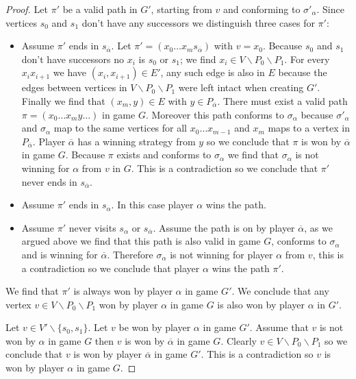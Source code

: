 \begin{lemma}
\begin{proof}
		Let $\pi'$ be a valid path in $G'$, starting from $v$ and conforming to $\sigma'_\alpha$. Since vertices $s_0$ and $s_1$ don't have any successors we distinguish three cases for $\pi'$:
		\begin{itemize}
			\item Assume $\pi'$ ends in $s_{\overline{\alpha}}$. Let $\pi' = (x_0\dots x_m s_{\overline{\alpha}})$ with $v = x_0$. Because $s_0$ and $s_1$ don't have successors no $x_i$ is $s_0$ or $s_1$; we find $x_i \in V\backslash P_0 \backslash P_1$. For every $x_ix_{i+1}$ we have $(x_i,x_{i+1}) \in E'$, any such edge is also in $E$ because the edges between vertices in $V\backslash P_0 \backslash P_1$ were left intact when creating $G'$. Finally we find that $(x_m,y) \in E$ with $y \in P_{\overline{\alpha}}$. There must exist a valid path $\pi = (x_0 \dots x_m y\dots)$ in game $G$. Moreover this path conforms to $\sigma_\alpha$ because $\sigma'_\alpha$ and $\sigma_\alpha$ map to the same vertices for all $x_0\dots x_{m-1}$ and $x_m$ maps to a vertex in $P_{\overline{\alpha}}$. Player $\overline{\alpha}$ has a winning strategy from $y$ so we conclude that $\pi$ is won by $\overline{\alpha}$ in game $G$. Because $\pi$ exists and conforms to $\sigma_\alpha$ we find that $\sigma_\alpha$ is not winning for $\alpha$ from $v$ in $G$. This is a contradiction so we conclude that $\pi'$ never ends in $s_{\overline{\alpha}}$.
			\item Assume $\pi'$ ends in $s_\alpha$. In this case player $\alpha$ wins the path.
			\item Assume $\pi'$ never visits $s_\alpha$ or $s_{\overline{\alpha}}$. Assume the path is on by player $\overline{\alpha}$, as we argued above we find that this path is also valid in game $G$, conforms to $\sigma_\alpha$ and is winning for $\overline{\alpha}$. Therefore $\sigma_\alpha$ is not winning for player $\alpha$ from $v$, this is a contradiction so we conclude that player ${\alpha}$ wins the path $\pi'$.
		\end{itemize}
		We find that $\pi'$ is always won by player $\alpha$ in game $G'$. We conclude that any vertex $v \in V \backslash P_0 \backslash P_1$ won by player $\alpha$ in game $G$ is also won by player $\alpha$ in $G'$. 
		
		Let $v \in V'\backslash \{s_0,s_1\}$. Let $v$ be won by player $\alpha$ in game $G'$. Assume that $v$ is not won by $\alpha$ in game $G$ then $v$ is won by $\overline{\alpha}$ in game $G$. Clearly $v \in V \backslash P_0 \backslash P_1$ so we conclude that $v$ is won by player $\overline{\alpha}$ in game $G'$. This is a contradiction so $v$ is won by player $\alpha$ in game $G$.
	\end{proof}
\end{lemma}

